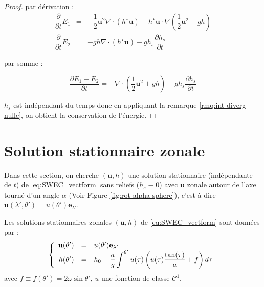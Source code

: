 \begin{proof}
par dérivation :
\begin{equation}
\begin{array}{rcl}
\dfrac{\partial}{\partial t} E_1 & = & -\dfrac{1}{2} \mathbf{u}^2 \nabla \cdot \left( h^{\star} \mathbf{u} \right) - h^{\star} \mathbf{u} \cdot \nabla \left( \dfrac{1}{2} \mathbf{u}^2 + gh \right) \\
\dfrac{\partial}{\partial t} E_2 & = & - gh \nabla \cdot \left( h^{\star} \mathbf{u} \right) - g h_s \dfrac{\partial h_s}{\partial t} 
\end{array}
\end{equation}

par somme :

$$
\dfrac{\partial E_1 + E_2}{\partial t} = - \nabla \cdot \left( \dfrac{1}{2} \mathbf{u}^2 + gh \right) - g h_s \dfrac{\partial h_s}{\partial t} 
$$

$h_s$ est indépendant du temps donc en appliquant la remarque \ref{rmq:int diverg nulle}, on obtient la conservation de l'énergie.
\end{proof}















\section{Solution stationnaire zonale}

Dans cette section, on cherche $(\mathbf{u},h)$ une solution stationnaire (indépendante de $t$) de \eqref{eq:SWEC_vectform} sans reliefs ($h_s \equiv 0$) avec $\mathbf{u}$ zonale autour de l'axe tourné d'un angle $\alpha$ (Voir Figure \ref{fig:rot alpha sphere}), c'est à dire $\mathbf{u}(\lambda', \theta') = u(\theta') \mathbf{e}_{\lambda'}$.

\begin{proposition}
Les solutions stationnaires zonales $(\mathbf{u},h)$ de \eqref{eq:SWEC_vectform} sont données par :
\begin{equation}
\left\lbrace
\begin{array}{rcl}
\mathbf{u}(\theta') & = & u(\theta') \mathbf{e}_{\lambda'}\\
h(\theta') & = & h_0 - \dfrac{a}{g} \displaystyle\int^{\theta'} u(\tau) \left( u(\tau) \dfrac{\tan (\tau)}{a} + f \right) d\tau\\
\end{array}
\right.
\label{eq:sol. stationaire zonale de swe}
\end{equation}
avec $f \equiv f(\theta') = 2 \omega \sin \theta'$, $u$ une fonction de classe $\mathcal{C}^1$.
\end{proposition}

